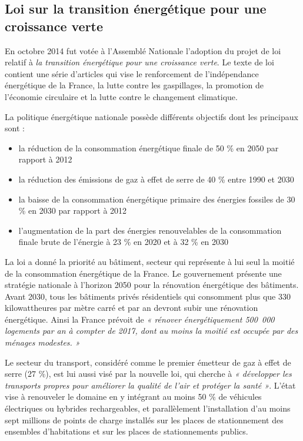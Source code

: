 \subsection{Loi sur la transition énergétique pour une croissance verte}


En octobre 2014 fut votée à l'Assemblé Nationale l’adoption du projet de loi relatif à \textit{la transition énergétique pour une croissance verte}. Le texte de loi contient une série d’articles qui vise le renforcement de l’indépendance énergétique de la France, la lutte contre les gaspillages, la promotion de l’économie circulaire et la lutte contre le changement climatique.


\bigbreak
La politique énergétique nationale possède différents objectifs dont les principaux sont \cite{loi_te} :
\begin{itemize}
  \item la réduction de la consommation énergétique finale de 50 \% en 2050 par rapport à 2012
  \item la réduction des émissions de gaz à effet de serre de 40 \% entre 1990 et 2030
  \item la baisse de la consommation énergétique primaire des énergies fossiles de 30 \% en 2030 par rapport à 2012
  \item l'augmentation de la part des énergies renouvelables de la consommation finale brute de l’énergie à 23 \% en 2020 et à 32 \% en 2030
\end{itemize}


\bigbreak
La loi a donné la priorité au bâtiment, secteur qui représente à lui seul la moitié de la consommation énergétique de la France. Le gouvernement présente une stratégie nationale à l’horizon 2050 pour la rénovation énergétique des bâtiments. Avant 2030, tous les bâtiments privés résidentiels qui consomment plus que 330 kilowattheures par mètre carré et par an devront subir une rénovation énergétique. Ainsi la France prévoit de \textit{« rénover énergétiquement 500~000 logements par an à compter de 2017, dont au moins la moitié est occupée par des ménages modestes. »}


\bigbreak
Le secteur du transport, considéré comme le premier émetteur de gaz à effet de serre (27 \%), est lui aussi visé par la nouvelle loi, qui cherche à \textit{« développer les transports propres pour améliorer la qualité de l’air et protéger la santé »}. L’état vise à renouveler le domaine en y intégrant au moins 50 \% de véhicules électriques ou hybrides rechargeables, et parallèlement l’installation d’au moins sept millions de points de charge installés sur les places de stationnement des ensembles d’habitations et sur les places de stationnements publics.


